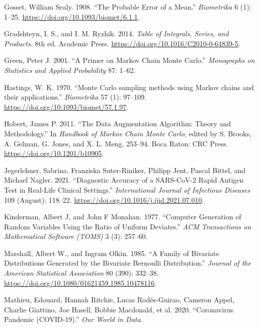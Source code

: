 \documentclass[
  11pt,
  letterpaper,
]{scrbook}
\newlength{\cslhangindent}
\newenvironment{CSLReferences}[2] %
 {\begin{list}{}{%
  \setlength{\itemindent}{0pt}
  \setlength{\leftmargin}{0pt}
  \setlength{\parsep}{0pt}
  \ifodd #1
   \setlength{\leftmargin}{\cslhangindent}
   \setlength{\itemindent}{-1\cslhangindent}
  \fi
  \setlength{\itemsep}{#2\baselineskip}}}
 {\end{list}}
\theoremstyle{definition}
\theoremstyle{definition}
\theoremstyle{definition}
\theoremstyle{plain}
\theoremstyle{plain}
\theoremstyle{remark}
\begin{document}
\begin{CSLReferences}{1}{0}
Gosset, William Sealy. 1908. {``The Probable Error of a Mean.''}
\emph{Biometrika} 6 (1): 1--25.
\url{https://doi.org/10.1093/biomet/6.1.1}.

Gradshteyn, I. S., and I. M. Ryzhik. 2014. \emph{Table of Integrals,
Series, and Products}. 8th ed. Academic Press.
\url{https://doi.org/10.1016/C2010-0-64839-5}.

Green, Peter J. 2001. {``A Primer on {M}arkov Chain {M}onte {C}arlo.''}
\emph{Monographs on Statistics and Applied Probability} 87: 1--62.

Hastings, W. K. 1970. {``{Monte {C}arlo sampling methods using {M}arkov
chains and their applications}.''} \emph{Biometrika} 57 (1): 97--109.
\url{https://doi.org/10.1093/biomet/57.1.97}.

Hobert, James P. 2011. {``The Data Augmentation Algorithm: Theory and
Methodology.''} In \emph{Handbook of {M}arkov Chain {M}onte {C}arlo},
edited by S. Brooks, A. Gelman, G. Jones, and X. L. Meng, 253--94. Boca
Raton: CRC Press. \url{https://doi.org/10.1201/b10905}.

Jegerlehner, Sabrina, Franziska Suter-Riniker, Philipp Jent, Pascal
Bittel, and Michael Nagler. 2021. {``Diagnostic Accuracy of a
{SARS-CoV-2} Rapid Antigen Test in Real-Life Clinical Settings.''}
\emph{International Journal of Infectious Diseases} 109 (August):
118--22. \url{https://doi.org/10.1016/j.ijid.2021.07.010}.

Kinderman, Albert J, and John F Monahan. 1977. {``Computer Generation of
Random Variables Using the Ratio of Uniform Deviates.''} \emph{ACM
Transactions on Mathematical Software (TOMS)} 3 (3): 257--60.

Marshall, Albert W., and Ingram Olkin. 1985. {``A Family of Bivariate
Distributions Generated by the Bivariate {B}ernoulli Distribution.''}
\emph{Journal of the American Statistical Association} 80 (390):
332--38. \url{https://doi.org/10.1080/01621459.1985.10478116}.

Mathieu, Edouard, Hannah Ritchie, Lucas Rodés-Guirao, Cameron Appel,
Charlie Giattino, Joe Hasell, Bobbie Macdonald, et al. 2020.
{``Coronavirus Pandemic (COVID-19).''} \emph{Our World in Data}.


\end{CSLReferences}
\end{document}
